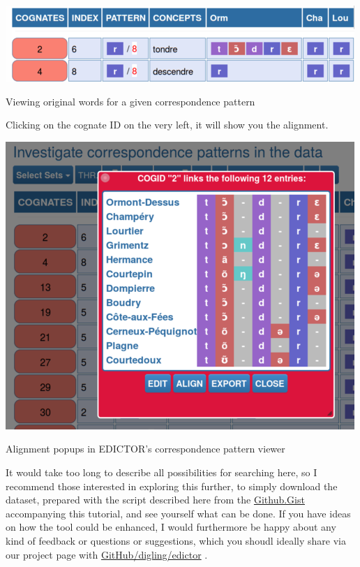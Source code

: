\documentclass[
  a4paper,
  14pt,
  oneside,
  tablecaptionabove
]{scrbook}
\begin{document}
\leavevmode\hypertarget{attachment_1810}{}%
\includegraphics[width=5.20833in,height=1.13542in]{images/__f-origin.hypotheses.org_wp-content_blogs.dir_4500_files_2019_02_edictor2-500x109.png}

Viewing original words for a given correspondence pattern

Clicking on the cognate ID on the very left, it will show you the
alignment.

\leavevmode\hypertarget{attachment_1811}{}%
\includegraphics[width=5.20833in,height=4.29167in]{images/__f-origin.hypotheses.org_wp-content_blogs.dir_4500_files_2019_02_edictor3-500x412.png}

Alignment popups in EDICTOR's correspondence pattern viewer

It would take too long to describe all possibilities for searching here,
so I recommend those interested in exploring this further, to simply
download the dataset, prepared with the script described here from the
\href{https://gist.github.com/LinguList/994317214fbdc78460feb551b113b05f}{Github.Gist}
accompanying this tutorial, and see yourself what can be done. If you
have ideas on how the tool could be enhanced, I would furthermore be
happy about any kind of feedback or questions or suggestions, which you
shoudl ideally share via our project page with
\href{https://github.com/digling/edictor}{GitHub/digling/edictor} .
\end{document}
